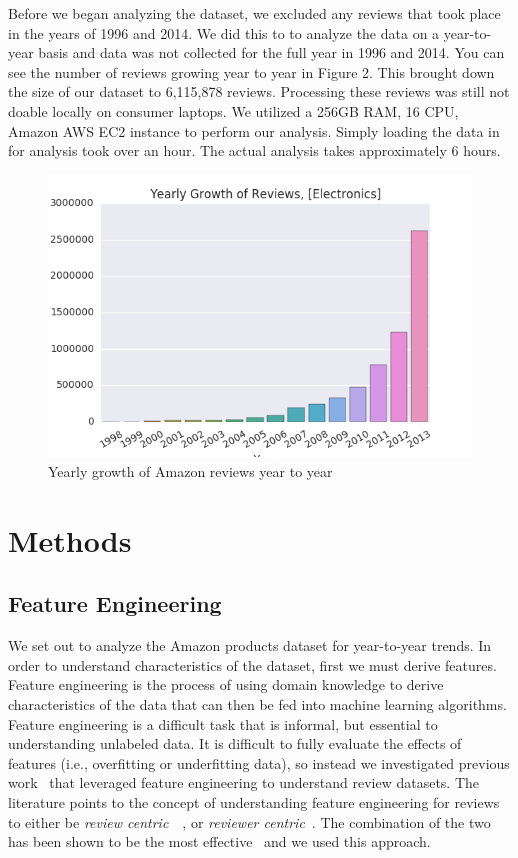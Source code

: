 \documentclass[journal, a4paper]{IEEEtran}
\begin{document}
Before we began analyzing the dataset, we excluded any reviews that took place in the years of 1996 and 2014. We did this to to analyze the data on a year-to-year basis and data was not collected for the full year in 1996 and 2014. You can see the number of reviews growing year to year in Figure 2. This brought down the size of our dataset to 6,115,878 reviews. Processing these reviews was still not doable locally on consumer laptops. We utilized a 256GB RAM, 16 CPU, Amazon AWS EC2 instance to perform our analysis. Simply loading the data in for analysis took over an hour. The actual analysis takes approximately 6 hours.

\begin{figure}[!hbt]
    \begin{center}
    \includegraphics[width=\columnwidth]{yearly_growth_of_reviews.png}
    \caption{Yearly growth of Amazon reviews year to year}
    \end{center}
\end{figure}


\section{Methods}

\subsection{Feature Engineering}
We set out to analyze the Amazon products dataset for year-to-year trends. In order to understand characteristics of the dataset, first we must derive features. Feature engineering is the process of using domain knowledge to derive characteristics of the data that can then be fed into machine learning algorithms. Feature engineering is a difficult task that is informal, but essential to understanding unlabeled data. It is difficult to fully evaluate the effects of features (i.e., overfitting or underfitting data), so instead we investigated previous work~\cite{4} that leveraged feature engineering to understand review datasets. The literature points to the concept of understanding feature engineering for reviews to either be \textit{review centric}~\cite{2}~\cite{5}, or \textit{reviewer centric}~\cite{6}.
The combination of the two has been shown to be the most effective~\cite{7} and we used this approach.
\end{document}
